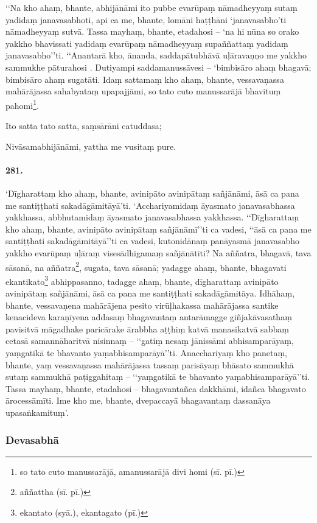 ‘‘Na kho ahaṃ, bhante, abhijānāmi ito pubbe evarūpaṃ nāmadheyyaṃ sutaṃ yadidaṃ janavasabhoti, api ca me, bhante, lomāni haṭṭhāni ‘janavasabho’ti nāmadheyyaṃ sutvā. Tassa mayhaṃ, bhante, etadahosi – ‘na hi nūna so orako yakkho bhavissati yadidaṃ evarūpaṃ nāmadheyyaṃ supaññattaṃ yadidaṃ janavasabho’’ti. ‘‘Anantarā kho, ānanda, saddapātubhāvā uḷāravaṇṇo me yakkho sammukhe pāturahosi . Dutiyampi saddamanussāvesi – ‘bimbisāro ahaṃ bhagavā; bimbisāro ahaṃ sugatāti. Idaṃ sattamaṃ kho ahaṃ, bhante, vessavaṇassa mahārājassa sahabyataṃ upapajjāmi, so tato cuto manussarājā bhavituṃ pahomi\footnote{so tato cuto manussarājā, amanussarājā divi homi (sī. pī.)}.

Ito satta tato satta, saṃsārāni catuddasa;

Nivāsamabhijānāmi, yattha me vusitaṃ pure.

\paragraph{281.} ‘Dīgharattaṃ kho ahaṃ, bhante, avinipāto avinipātaṃ sañjānāmi, āsā ca pana me santiṭṭhati sakadāgāmitāyā’ti. ‘Acchariyamidaṃ āyasmato janavasabhassa yakkhassa, abbhutamidaṃ āyasmato janavasabhassa yakkhassa. ‘‘Dīgharattaṃ kho ahaṃ, bhante, avinipāto avinipātaṃ sañjānāmī’’ti ca vadesi, ‘‘āsā ca pana me santiṭṭhati sakadāgāmitāyā’’ti ca vadesi, kutonidānaṃ panāyasmā janavasabho yakkho evarūpaṃ uḷāraṃ visesādhigamaṃ sañjānātīti? Na aññatra, bhagavā, tava sāsanā, na aññatra\footnote{aññattha (sī. pī.)}, sugata, tava sāsanā; yadagge ahaṃ, bhante, bhagavati ekantikato\footnote{ekantato (syā.), ekantagato (pī.)} abhippasanno, tadagge ahaṃ, bhante, dīgharattaṃ avinipāto avinipātaṃ sañjānāmi, āsā ca pana me santiṭṭhati sakadāgāmitāya. Idhāhaṃ, bhante, vessavaṇena mahārājena pesito virūḷhakassa mahārājassa santike kenacideva karaṇīyena addasaṃ bhagavantaṃ antarāmagge giñjakāvasathaṃ pavisitvā māgadhake paricārake ārabbha aṭṭhiṃ katvā manasikatvā sabbaṃ cetasā samannāharitvā nisinnaṃ – ‘‘gatiṃ nesaṃ jānissāmi abhisamparāyaṃ, yaṃgatikā te bhavanto yaṃabhisamparāyā’’ti. Anacchariyaṃ kho panetaṃ, bhante, yaṃ vessavaṇassa mahārājassa tassaṃ parisāyaṃ bhāsato sammukhā sutaṃ sammukhā paṭiggahitaṃ – ‘‘yaṃgatikā te bhavanto yaṃabhisamparāyā’’ti. Tassa mayhaṃ, bhante, etadahosi – bhagavantañca dakkhāmi, idañca bhagavato ārocessāmīti. Ime kho me, bhante, dvepaccayā bhagavantaṃ dassanāya upasaṅkamituṃ’.

\subsubsection{Devasabhā}

